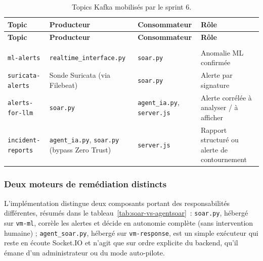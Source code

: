 \begingroup
\renewcommand{\arraystretch}{1.25}
\small
\begin{xltabular}{\textwidth}{|>{\raggedright\arraybackslash}p{3.2cm}|>{\raggedright\arraybackslash}p{3.2cm}|>{\raggedright\arraybackslash}p{2.8cm}|>{\raggedright\arraybackslash}X|}

\caption{Topics Kafka mobilisés par le sprint 6.}
\label{tab:topics} \\

\hline
{}
\textbf{Topic} & \textbf{Producteur} & \textbf{Consommateur} & \textbf{Rôle} \\ \hline
\endfirsthead

\hline
{}
\textbf{Topic} & \textbf{Producteur} & \textbf{Consommateur} & \textbf{Rôle} \\ \hline
\endhead

\hline
{} \\
\endfoot

\endlastfoot

\texttt{ml-alerts} & \texttt{realtime\_interface.py} & \texttt{soar.py} & Anomalie ML confirmée \\ \hline
\texttt{suricata-alerts} & Sonde Suricata (via Filebeat) & \texttt{soar.py} & Alerte par signature \\ \hline
\texttt{alerts-for-llm} & \texttt{soar.py} & \texttt{agent\_ia.py}, \texttt{server.js} & Alerte corrélée à analyser / à afficher \\ \hline
\texttt{incident-reports} & \texttt{agent\_ia.py}, \texttt{soar.py} (bypass Zero Trust) & \texttt{server.js} & Rapport structuré ou alerte de contournement \\ \hline

\end{xltabular}
\endgroup

\subsubsection{Deux moteurs de remédiation distincts}
L'implémentation distingue deux composants portant des responsabilités différentes, résumés dans le tableau~\ref{tab:soar-vs-agentsoar}~: \texttt{soar.py}, hébergé sur \texttt{vm-ml}, corrèle les alertes et décide en autonomie complète (sans intervention humaine) ; \texttt{agent\_soar.py}, hébergé sur \texttt{vm-response}, est un simple exécuteur qui reste en écoute Socket.IO et n'agit que sur ordre explicite du backend, qu'il émane d'un administrateur ou du mode auto-pilote.


